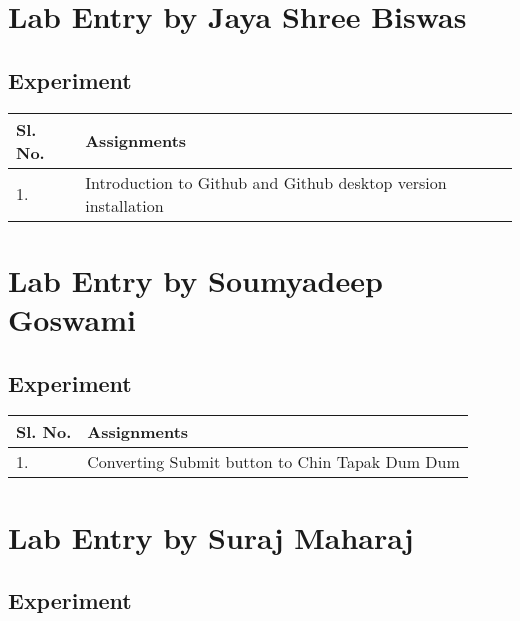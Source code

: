 \documentclass[12pt, a4paper]{article}
\begin{document}
\vspace{1.5cm}
\section{Lab Entry by Jaya Shree Biswas}

\vspace{0.7cm}
\subsection{Experiment}

\vspace{0.5cm}

\begin{table}[ht]
\centering
\begin{tabular}{|p{50pt}|p{200pt}|}
\hline
\textbf{Sl. No.} & \textbf{Assignments} \\ \hline
1. & Introduction to Github and Github desktop version installation \\ \hline
\end{tabular}
\end{table}

\section{Lab Entry by Soumyadeep Goswami}
\subsection{Experiment}

\vspace{0.5cm}
\begin{table}[ht]
\centering
\begin{tabular}{|p{50pt}|p{200pt}|}
\hline
\textbf{Sl. No.} & \textbf{Assignments} \\ \hline
1. & Converting Submit button to Chin Tapak Dum Dum \\ \hline
\end{tabular}
\end{table}

\section{Lab Entry by Suraj Maharaj}
\subsection{Experiment}
\end{document}
